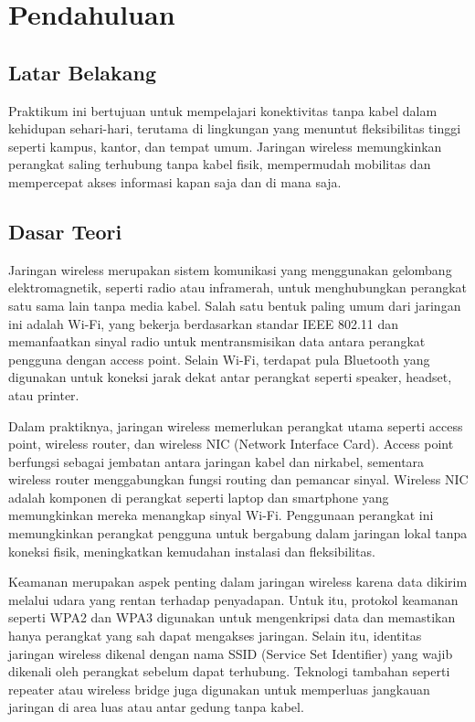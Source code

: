 \section{Pendahuluan}
\subsection{Latar Belakang}
Praktikum ini bertujuan untuk  mempelajari konektivitas tanpa kabel dalam kehidupan sehari-hari, terutama di lingkungan yang menuntut fleksibilitas tinggi seperti kampus, kantor, dan tempat umum. Jaringan wireless memungkinkan perangkat saling terhubung tanpa kabel fisik, mempermudah mobilitas dan mempercepat akses informasi kapan saja dan di mana saja.

\subsection{Dasar Teori}
Jaringan wireless merupakan sistem komunikasi yang menggunakan gelombang elektromagnetik, seperti radio atau inframerah, untuk menghubungkan perangkat satu sama lain tanpa media kabel. Salah satu bentuk paling umum dari jaringan ini adalah Wi-Fi, yang bekerja berdasarkan standar IEEE 802.11 dan memanfaatkan sinyal radio untuk mentransmisikan data antara perangkat pengguna dengan access point. Selain Wi-Fi, terdapat pula Bluetooth yang digunakan untuk koneksi jarak dekat antar perangkat seperti speaker, headset, atau printer.

Dalam praktiknya, jaringan wireless memerlukan perangkat utama seperti access point, wireless router, dan wireless NIC (Network Interface Card). Access point berfungsi sebagai jembatan antara jaringan kabel dan nirkabel, sementara wireless router menggabungkan fungsi routing dan pemancar sinyal. Wireless NIC adalah komponen di perangkat seperti laptop dan smartphone yang memungkinkan mereka menangkap sinyal Wi-Fi. Penggunaan perangkat ini memungkinkan perangkat pengguna untuk bergabung dalam jaringan lokal tanpa koneksi fisik, meningkatkan kemudahan instalasi dan fleksibilitas.

Keamanan merupakan aspek penting dalam jaringan wireless karena data dikirim melalui udara yang rentan terhadap penyadapan. Untuk itu, protokol keamanan seperti WPA2 dan WPA3 digunakan untuk mengenkripsi data dan memastikan hanya perangkat yang sah dapat mengakses jaringan. Selain itu, identitas jaringan wireless dikenal dengan nama SSID (Service Set Identifier) yang wajib dikenali oleh perangkat sebelum dapat terhubung. Teknologi tambahan seperti repeater atau wireless bridge juga digunakan untuk memperluas jangkauan jaringan di area luas atau antar gedung tanpa kabel.

